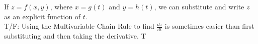 {If $z=f(x,y)$, where $x=g(t)$ and $y=h(t)$, we can substitute and write $z$ as an explicit function of $t$.\\
T/F: Using the Multivariable Chain Rule to find $\frac{dz}{dt}$ is  sometimes easier than  first substituting and then taking the derivative.
}
{T}

